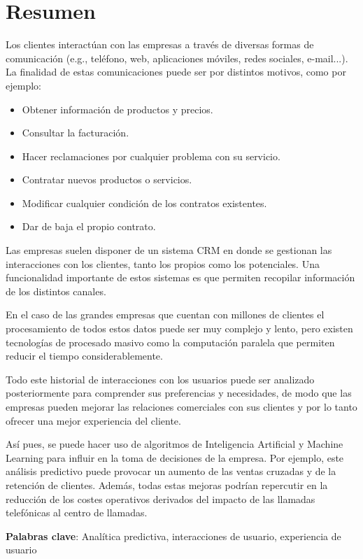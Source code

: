 \chapter*{Resumen}

\onehalfspacing

Los clientes interactúan con las empresas a través de diversas formas de comunicación (e.g., teléfono, web, aplicaciones móviles, redes sociales, e-mail...). La finalidad de estas comunicaciones puede ser por distintos motivos, como por ejemplo: 

\begin{itemize}
  \item Obtener información de productos y precios.
  \item Consultar la facturación.
  \item Hacer reclamaciones por cualquier problema con su servicio.
  \item Contratar nuevos productos o servicios.
  \item Modificar cualquier condición de los contratos existentes.
  \item Dar de baja el propio contrato.
\end{itemize}

Las empresas suelen disponer de un sistema CRM en donde se gestionan las interacciones con los clientes, tanto los propios como los potenciales. Una funcionalidad importante de estos sistemas es que permiten recopilar información de los distintos canales. 

En el caso de las grandes empresas que cuentan con millones de clientes el procesamiento de todos estos datos puede ser muy complejo y lento, pero existen tecnologías de procesado masivo como la computación paralela que permiten reducir el tiempo considerablemente. 

Todo este historial de interacciones con los usuarios puede ser analizado posteriormente para comprender sus preferencias y necesidades, de modo que las empresas pueden mejorar las relaciones comerciales con sus clientes y por lo tanto ofrecer una mejor experiencia del cliente. 

Así pues, se puede hacer uso de algoritmos de Inteligencia Artificial y Machine Learning para influir en la toma de decisiones de la empresa. Por ejemplo, este análisis predictivo puede provocar un aumento de las ventas cruzadas y de la retención de clientes. Además, todas estas mejoras podrían repercutir en la reducción de los costes operativos derivados del impacto de las llamadas telefónicas al centro de llamadas.

\vspace{1.5cm}

\textbf{Palabras clave}: Analítica predictiva, interacciones de usuario, experiencia de usuario